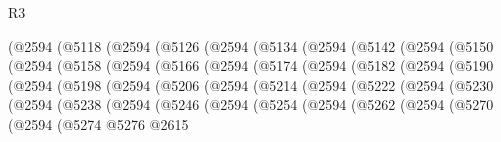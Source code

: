 \begin{lexlean}{R3}
\begin{coremodule}
          (@2594
            (@5118
              (@2594
                (@5126
                  (@2594
                    (@5134
                      (@2594
                        (@5142
                          (@2594
                            (@5150
                              (@2594
                                (@5158
                                  (@2594
                                    (@5166
                                      (@2594
                                        (@5174
                                          (@2594
                                            (@5182
                                              (@2594
                                                (@5190
                                                  (@2594
                                                    (@5198
                                                      (@2594
                                                        (@5206
                                                          (@2594
                                                            (@5214
                                                              (@2594
                                                                (@5222
                                                                  (@2594
                                                                    (@5230
                                                                      (@2594
                                                                        (@5238
                                                                          (@2594
                                                                            (@5246
                                                                              (@2594
                                                                                (@5254
                                                                                  (@2594
                                                                                    (@5262
                                                                                      (@2594
                                                                                        (@5270
                                                                                          (@2594
                                                                                            (@5274
                                                                                              @5276
                                                                                              @2615

\end{coremodule}
\end{lexlean}
